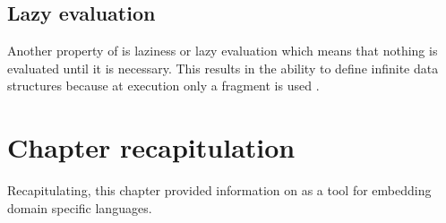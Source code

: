 \documentclass[thesis-solanki.tex]{subfiles}
\begin{document}
\subsection{Lazy evaluation}
Another property of  is laziness or lazy evaluation which means that nothing is evaluated until
it is necessary.
This results in the ability to define infinite data structures because at execution only a fragment is used
\cite{website:haskelllazinesswiki}.



\section{Chapter recapitulation}
Recapitulating, this chapter provided information on  as a tool for embedding domain specific languages.


\ifMain
\begin{scope}
  \nolinenumbers
  \enotesize
  \par
  \begin{singlespace}
  \setlength{\parskip}{12pt plus 2pt minus 1pt}
  \theendnotes
  \par
  \end{singlespace}
\end{scope}
\fi
\end{document}
